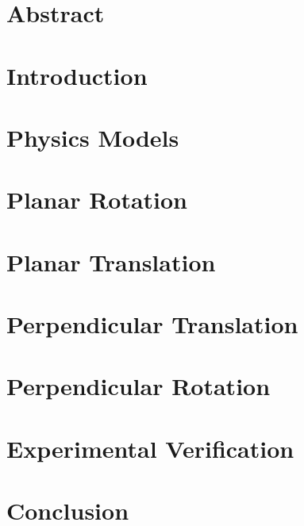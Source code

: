 \documentclass[10pt]{article}
\begin{document}
\section{Abstract}
\section{Introduction}
\section{Physics Models}
\section{Planar Rotation}
\section{Planar Translation}
\section{Perpendicular Translation}
\section{Perpendicular Rotation}
\section{Experimental Verification}
\section{Conclusion}
\end{document}
